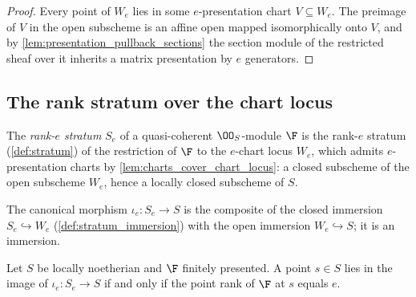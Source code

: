 \begin{proof}
  \leanok
  Every point of \(W_e\) lies in some \(e\)-presentation chart
  \(V \subseteq W_e\).  The preimage of \(V\) in the open subscheme is an
  affine open mapped isomorphically onto \(V\), and by
  \cref{lem:presentation_pullback_sections} the section module of the
  restricted sheaf over it inherits a matrix presentation by \(e\)
  generators.
\end{proof}

\subsection{The rank stratum over the chart locus}

\begin{definition}
  \label{def:rank_stratum}
  \leanok
  The \emph{rank-\(e\) stratum} \(S_e\) of a quasi-coherent
  \(\OO_S\)-module \(\F\) is the rank-\(e\) stratum (\cref{def:stratum}) of
  the restriction of \(\F\) to the \(e\)-chart locus \(W_e\), which admits
  \(e\)-presentation charts by \cref{lem:charts_cover_chart_locus}: a
  closed subscheme of the open subscheme \(W_e\), hence a locally closed
  subscheme of \(S\).
\end{definition}

\begin{definition}
  \label{def:rank_stratum_immersion}
  \leanok
  The canonical morphism \(\iota_e : S_e \to S\) is the composite of the
  closed immersion \(S_e \hookrightarrow W_e\)
  (\cref{def:stratum_immersion}) with the open immersion
  \(W_e \hookrightarrow S\); it is an immersion.
\end{definition}

\begin{theorem}
  \label{thm:mem_range_rank_stratum}
  \leanok
  Let \(S\) be locally noetherian and \(\F\) finitely presented.  A point
  \(s \in S\) lies in the image of \(\iota_e : S_e \to S\) if and only if
  the point rank of \(\F\) at \(s\) equals \(e\).
\end{theorem}

